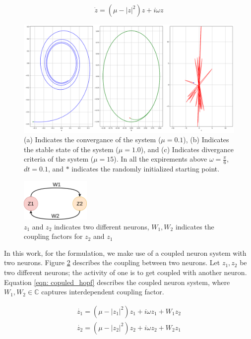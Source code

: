 \documentclass{article}
\begin{document}
\begin{equation}
 \label{eqn: hopf}
 \dot{z} = (\mu - |z|^2)z + i\omega z
\end{equation}

\begin{figure}
 \centering
 \includegraphics[width=1\textwidth]{hopf_initial.png}
 \caption{(a) Indicates the convergance of the system ($\mu = 0.1$), (b) Indicates the stable state of the system ($\mu = 1.0$), and (c) Indicates divergance criteria of the system ($ \mu = 15$). In all the expirements above $\omega = \frac{\pi}{6}$, $dt = 0.1$, and $*$ indicates the randomly initialized starting point.}
 \label{fig: stable}
\end{figure}

\begin{figure}
 \centering
 \includegraphics[width=0.3\textwidth]{two_neurons.png}
 \caption{$z_1$ and  $z_2$ indicates two different neurons, $W_1, W_2$ indicates the coupling factors for $z_2$ and $z_1$}
 \label{fig: two_neurons}
\end{figure}

In this work, for the formulation, we make use of a coupled neuron system with two neurons. Figure \ref{fig: two_neurons} describes the coupling between two neurons. Let $z_1, z_2$ be two different neurons; the activity of one is to get coupled with another neuron. Equation \ref{eqn: copuled_hopf} describes the coupled neuron system, where $W_1, W_2 \in \mathbb{C}$ captures interdependent coupling factor. 

\begin{subequations}
\label{eqn: copuled_hopf}
\begin{align}
 \dot{z_1} = (\mu - |z_1|^2)z_1 + i\omega z_1 + W_1 z_2 \\ 
 \dot{z_2} = (\mu - |z_2|^2)z_2 + i\omega z_2 + W_2 z_1 
\end{align}
\end{subequations}
\end{document}
